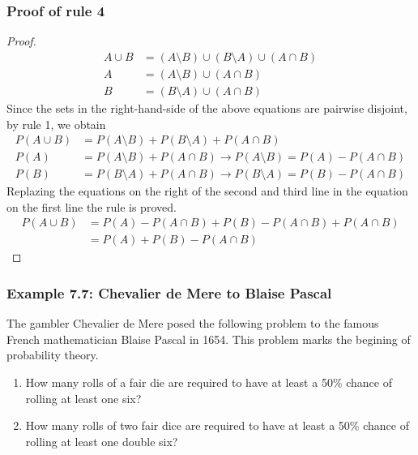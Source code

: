 \begin{frame}
    \frametitle{Proof of rule 4}
    \tiny
	\begin{proof}
		\begin{align*}
            A\cup B&=\left(A\setminus B\right)\cup\left(B\setminus A\right)\cup\left(A\cap B\right)\\
            A&=\left(A\setminus B\right)\cup \left(A\cap B\right)\\
            B&=\left(B\setminus A\right)\cup \left(A\cap B\right)
		\end{align*}
        Since the sets in the right-hand-side of the above equations are
        pairwise disjoint, by rule 1, we obtain
		\begin{align*}
            P\left(A\cup B\right)&=P\left(A\setminus B\right)+P\left(B\setminus A\right)+P\left(A\cap B\right)\\
            P\left(A\right)&=P\left(A\setminus B\right)+P\left(A\cap B\right)\rightarrow P\left(A\setminus B\right)=P\left(A\right)-P\left(A\cap B\right)\\
            P\left(B\right)&=P\left(B\setminus A\right)+P\left(A\cap B\right)\rightarrow P\left(B\setminus A\right)=P\left(B\right)-P\left(A\cap B\right)
		\end{align*}
        Replazing the equations on the right of the second and third line in
        the equation on the first line the rule is proved.
		\begin{align*}
            P\left(A\cup B\right)&=P\left(A\right)-P\left(A\cap B\right)+P\left(B\right)-P\left(A\cap B\right)+P\left(A\cap B\right)\\
                                 &=P\left(A\right)+P\left(B\right)-P\left(A\cap B\right)
		\end{align*}
	\end{proof}
    \normalsize
\end{frame}

\begin{frame}
    \frametitle{Example 7.7: Chevalier de Mere to Blaise Pascal}

    The gambler Chevalier de Mere posed the following problem to the famous
    French mathematician Blaise Pascal in 1654. This problem marks the begining
    of probability theory.

    \begin{manualProbExample}{7.7}
        \begin{enumerate}[a]

            \item How many rolls of a fair die are required to have at least a
                50\% chance of rolling at least one six?

            \item How many rolls of two fair dice are required to have at
                least a 50\% chance of rolling at least one double six?

        \end{enumerate}
    \end{manualProbExample}

\end{frame}

